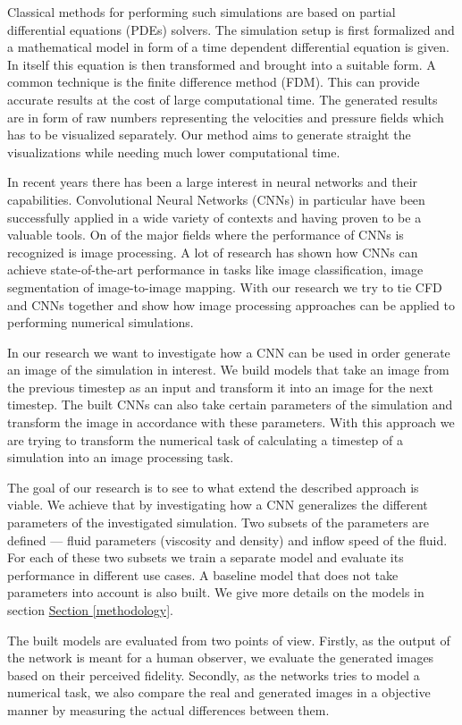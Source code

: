 \documentclass{llncs}
\newcommand{\refsec}[1]{\hyperref[#1]{Section \ref*{#1}}}
\begin{document}
Classical methods for performing such simulations are based on partial differential equations (PDEs) solvers. The simulation setup is first formalized and a mathematical model in form of a time dependent differential equation is given. In itself this equation is then transformed and brought into a suitable form. A common technique is the finite difference method (FDM). This can provide accurate results at the cost of large computational time. The generated results are in form of raw numbers representing the velocities and pressure fields which has to be visualized separately. Our method aims to generate straight the visualizations while needing much lower computational time.

In recent years there has been a large interest in neural networks and their capabilities. Convolutional Neural Networks (CNNs) in particular have been successfully applied in a wide variety of contexts and having proven to be a valuable tools. On of the major fields where the performance of CNNs is recognized is image processing. A lot of research has shown how CNNs can achieve state-of-the-art performance in tasks like image classification, image segmentation of image-to-image mapping. With our research we try to tie CFD and CNNs together and show how image processing approaches can be applied to performing numerical simulations.

In our research we want to investigate how a CNN can be used in order generate an image of the simulation in interest. We build models that take an image from the previous timestep as an input and transform it into an image for the next timestep. The built CNNs can also take certain parameters of the simulation and transform the image in accordance with these parameters. With this approach we are trying to transform the numerical task of calculating a timestep of a simulation into an image processing task.

The goal of our research is to see to what extend the described approach is viable. We achieve that by investigating how a CNN generalizes the different parameters of the investigated simulation. Two subsets of the parameters are defined --- fluid parameters (viscosity and density) and inflow speed of the fluid. For each of these two subsets we train a separate model and evaluate its performance in different use cases. A baseline model that does not take parameters into account is also built. We give more details on the models in section \refsec{methodology}.


The built models are evaluated from two points of view. Firstly, as the output of the network is meant for a human observer, we evaluate the generated images based on their perceived fidelity. Secondly, as the networks tries to model a numerical task, we also compare the real and generated images in a objective manner by measuring the actual differences between them.
\end{document}
